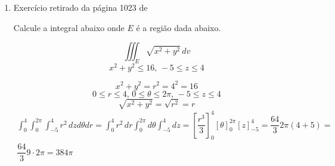 \begin{enumerate}
	\item Exercício retirado da página 1023 de \cite{James_Stewart_calculo_v2}
	
	Calcule a integral abaixo onde $E$ é a região dada abaixo.
	
	\begin{equation*}
		\iiint_E \sqrt{x^2 + y^2}\, dv
	\end{equation*}
	\begin{equation*}
		x^2 + y^2 \leq 16,\, -5 \leq z \leq 4
	\end{equation*}
	
	\begin{equation*}
		x^2 + y^2 = r^2 = 4^2 = 16
	\end{equation*}
	\begin{equation*}
		0 \leq r \leq 4,\, 0 \leq \theta \leq 2\pi,\, -5 \leq z \leq 4
	\end{equation*}
	\begin{equation*}
		\sqrt{x^2 + y^2} = \sqrt{r^2} = r
	\end{equation*}
	\begin{gather*}
		\int_0^4 \int_0^{2\pi} \int_{-5}^4 r^2\, dz d\theta dr = \int_0^4 r^2\, dr \int_0^{2\pi} d\theta \int_{-5}^4 dz = \left[\dfrac{r^3}{3}\right]_0^4 \left[\theta\right]_0^{2\pi} \left[z\right]_{-5}^4 = \dfrac{64}{3}2\pi(4 + 5) =\\ \dfrac{64}{3} 9\cdot 2\pi = 384\pi
	\end{gather*}
\end{enumerate}